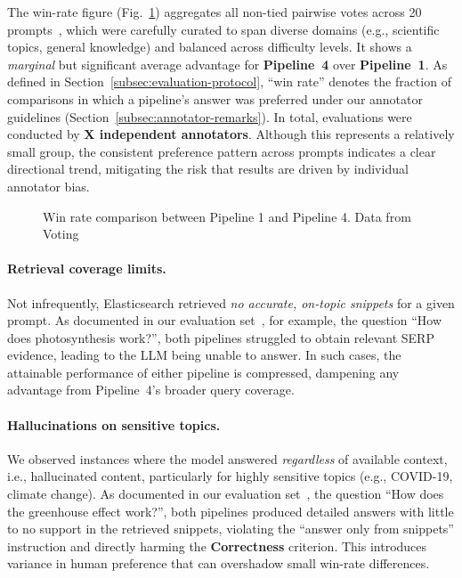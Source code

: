 \documentclass[manuscript,screen]{acmart}
\begin{document}
\begin{CCSXML}
The win-rate figure (Fig.~\ref{fig:winrate-overall}) aggregates all non-tied pairwise votes across 20 prompts~\cite{eval}, which were carefully curated to span diverse domains (e.g., scientific topics, general knowledge) and balanced across difficulty levels. It shows a \emph{marginal} but significant average advantage for \textbf{Pipeline~4} over \textbf{Pipeline~1}. As defined in Section~\ref{subsec:evaluation-protocol}, “win rate” denotes the fraction of comparisons in which a pipeline’s answer was preferred under our annotator guidelines (Section~\ref{subsec:annotator-remarks}). In total, evaluations were conducted by \textbf{X independent annotators}. Although this represents a relatively small group, the consistent preference pattern across prompts indicates a clear directional trend, mitigating the risk that results are driven by individual annotator bias.

\begin{figure}[H]
\centering
{}
\caption{Win rate comparison between Pipeline 1 and Pipeline 4. Data from Voting \cite{eval}}
\label{fig:winrate-overall}
\end{figure}

\paragraph{Retrieval coverage limits.}
\label{retrieval-coverage-limits}
Not infrequently, Elasticsearch retrieved \emph{no accurate, on-topic snippets}
for a given prompt. As documented in our evaluation set~\citep{eval}, for example,
the question “How does photosynthesis work?”, both pipelines struggled to obtain
relevant SERP evidence, leading to the LLM being unable to answer. In such cases,
the attainable performance of either pipeline is compressed, dampening any
advantage from Pipeline~4’s broader query coverage.


\paragraph{Hallucinations on sensitive topics.}
We observed instances where the model answered \emph{regardless} of available
context, i.e., hallucinated content, particularly for highly sensitive topics
(e.g., COVID-19, climate change). As documented in our evaluation set~\citep{eval}, the question “How does the greenhouse effect work?”, both pipelines
produced detailed answers with little to no support in the retrieved snippets,
violating the “answer only from snippets” instruction and directly harming the
\textbf{Correctness} criterion. This introduces variance in human preference
that can overshadow small win-rate differences.



\end{CCSXML}
\end{document}

